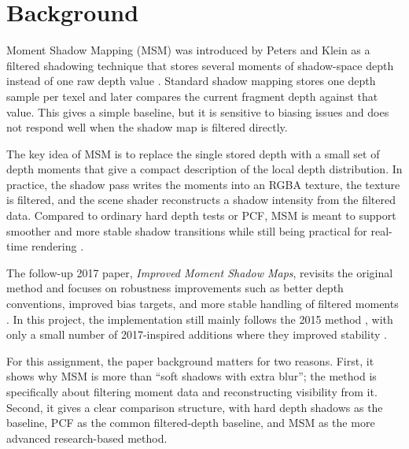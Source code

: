 \section{Background}

Moment Shadow Mapping (MSM) was introduced by Peters and Klein as a filtered shadowing technique that stores several moments of shadow-space depth instead of one raw depth value \cite{peters2015msm}. Standard shadow mapping stores one depth sample per texel and later compares the current fragment depth against that value. This gives a simple baseline, but it is sensitive to biasing issues and does not respond well when the shadow map is filtered directly.

The key idea of MSM is to replace the single stored depth with a small set of depth moments that give a compact description of the local depth distribution. In practice, the shadow pass writes the moments into an RGBA texture, the texture is filtered, and the scene shader reconstructs a shadow intensity from the filtered data. Compared to ordinary hard depth tests or PCF, MSM is meant to support smoother and more stable shadow transitions while still being practical for real-time rendering \cite{peters2015msm}.

The follow-up 2017 paper, \textit{Improved Moment Shadow Maps}, revisits the original method and focuses on robustness improvements such as better depth conventions, improved bias targets, and more stable handling of filtered moments \cite{peters2017improved}. In this project, the implementation still mainly follows the 2015 method \cite{peters2015msm}, with only a small number of 2017-inspired additions where they improved stability \cite{peters2017improved}.

For this assignment, the paper background matters for two reasons. First, it shows why MSM is more than ``soft shadows with extra blur''; the method is specifically about filtering moment data and reconstructing visibility from it. Second, it gives a clear comparison structure, with hard depth shadows as the baseline, PCF as the common filtered-depth baseline, and MSM as the more advanced research-based method.
